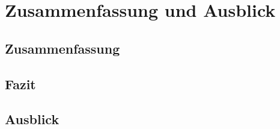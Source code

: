\chapter{Zusammenfassung und Ausblick} 
\section{Zusammenfassung}

\section{Fazit}

\section{Ausblick}